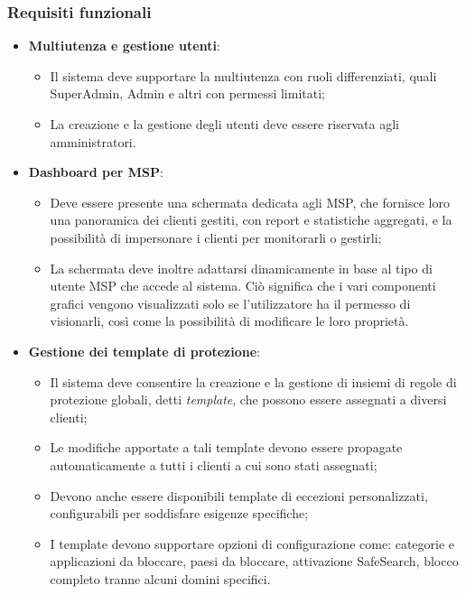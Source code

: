 \subsubsection{Requisiti funzionali}
\begin{itemize}
  \item \textbf{Multiutenza e gestione utenti}:
    \begin{itemize}
      \item Il sistema deve supportare la multiutenza con ruoli differenziati, quali SuperAdmin, Admin e altri con permessi limitati;
      \item La creazione e la gestione degli utenti deve essere riservata agli amministratori.
    \end{itemize}

  \item \textbf{Dashboard per MSP}:
    \begin{itemize}
      \item Deve essere presente una schermata dedicata agli MSP, che fornisce loro una panoramica dei clienti gestiti, con report e statistiche aggregati, e la possibilità di impersonare i clienti per monitorarli o gestirli;
      \item La schermata deve inoltre adattarsi dinamicamente in base al tipo di utente MSP che accede al sistema. Ciò significa che i vari componenti grafici vengono visualizzati solo se l'utilizzatore ha il permesso di visionarli, così come la possibilità di modificare le loro proprietà.
    \end{itemize}

  \item \textbf{Gestione dei template di protezione}:
    \begin{itemize}
      \item Il sistema deve consentire la creazione e la gestione di insiemi di regole di protezione globali, detti \emph{template}, che possono essere assegnati a diversi clienti;
      \item Le modifiche apportate a tali template devono essere propagate automaticamente a tutti i clienti a cui sono stati assegnati;
      \item Devono anche essere disponibili template di eccezioni personalizzati, configurabili per soddisfare esigenze specifiche;
      \item I template devono supportare opzioni di configurazione come: categorie e applicazioni da bloccare, paesi da bloccare, attivazione SafeSearch, blocco completo tranne alcuni domini specifici.
    \end{itemize}


\end{itemize}
